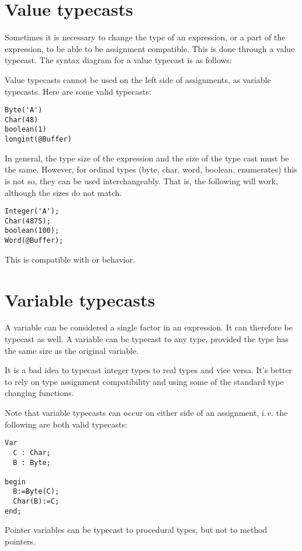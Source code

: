 \section{Value typecasts}

Sometimes it is necessary to change the type of an expression, or a part of
the expression, to be able to be assignment compatible. This is done through
a value typecast. The syntax diagram for a value typecast is as follows:

Value typecasts cannot be used on the left side of assignments, as variable
typecasts.
Here are some valid typecasts:
\begin{verbatim}
Byte('A')
Char(48)
boolean(1)
longint(@Buffer)
\end{verbatim}
In general, the type size of the expression and the size of the type cast
must be the same. However, for ordinal types (byte, char, word, boolean,
enumerates) this is not so, they can be used interchangeably.
That is, the following will work, although the sizes do not match.
\begin{verbatim}
Integer('A');
Char(4875);
boolean(100);
Word(@Buffer);
\end{verbatim}
This is compatible with \delphi or \tp behavior.

\section{Variable typecasts}
A variable can be considered a single factor in an expression. It can
therefore be typecast as well. A variable can be typecast to any type,
provided the type has the same size as the original variable.

It is a bad idea to typecast integer types to real types and vice versa.
It's better to rely on type assignment compatibility and using some of the
standard type changing functions.

Note that variable typecasts can occur on either side of an assignment,
i.\,e. the following are both valid typecasts:
\begin{verbatim}
Var
  C : Char;
  B : Byte;

begin
  B:=Byte(C);
  Char(B):=C;
end;
\end{verbatim}
Pointer variables can be typecast to procedural types, but not
to method pointers.


